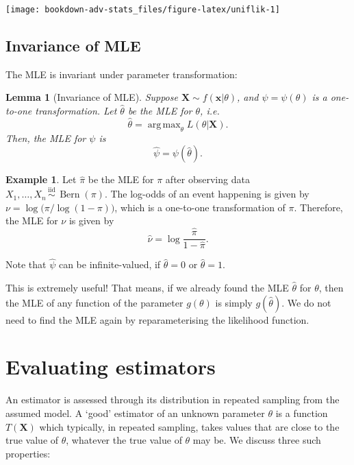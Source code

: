 \documentclass[
]{book}
\newcommand{\bx}{{\boldsymbol x}}
\newcommand{\bX}{{\boldsymbol X}}
\DeclareMathOperator{\Bern}{Bern}
\newcommand{\iid}{\,\overset{\text{iid}}{\sim}\,}
\DeclareMathOperator*{\argmax}{arg\,max}
\newtheorem{lemma}{Lemma}[chapter]
\theoremstyle{definition}
\theoremstyle{definition}
\newtheorem{example}{Example}[chapter]
\theoremstyle{definition}
\theoremstyle{definition}
\theoremstyle{remark}
\begin{document}
\begin{center}\texttt{[image: bookdown-adv-stats\_files/figure-latex/uniflik-1]} \end{center}

\hypertarget{invariance-of-mle}{%
\subsection{Invariance of MLE}\label{invariance-of-mle}}

The MLE is invariant under parameter transformation:

\begin{lemma}[Invariance of MLE]
Suppose $\bX\sim f(\bx|\theta)$, and $\psi=\psi(\theta)$ is a
one-to-one transformation. Let $\hat\theta$ be the MLE for $\theta$,
i.e. $$\hat\theta = \argmax_\theta L(\theta|\bX).$$ Then, the MLE for
$\psi$ is $$\hat\psi = \psi(\hat\theta).$$
\end{lemma}

\begin{example}
Let \(\hat\pi\) be the MLE for \(\pi\) after observing data
\(X_1,\dots,X_n\iid \Bern(\pi)\). The log-odds of an event happening is
given by \(\nu = \log\big(\pi/\log(1-\pi)\big)\), which is a one-to-one
transformation of \(\pi\). Therefore, the MLE for \(\nu\) is given by
\[\hat\nu = \log \frac{\hat\pi}{1-\hat\pi}.\]

Note that \(\hat\psi\) can be infinite-valued, if \(\hat\theta=0\) or \(\hat\theta=1\).
\end{example}

This is extremely useful! That means, if we already found the MLE \(\hat\theta\) for \(\theta\), then the MLE of any function of the parameter \(g(\theta)\) is simply \(g(\hat\theta)\).
We do not need to find the MLE again by reparameterising the likelihood function.

\hypertarget{evaluating-estimators}{%
\section{Evaluating estimators}\label{evaluating-estimators}}

An estimator is assessed through its distribution in repeated sampling from the assumed model.
A `good' estimator of an unknown parameter \(\theta\) is a function \(T(\bX)\) which typically, in repeated sampling, takes values that are close to the true value of \(\theta\), whatever the true value of \(\theta\) may be.
We discuss three such properties:
\end{document}
